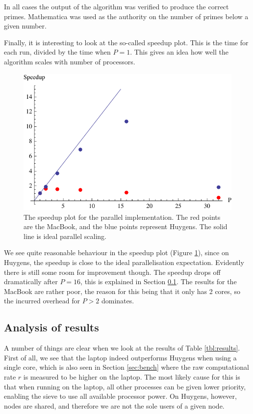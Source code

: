 \documentclass[a4paper]{article}
\begin{document}
In all cases the output of the algorithm was verified to produce the correct
primes. Mathematica was used as the authority on the number of primes below a
given number. 

Finally, it is interesting to look at the so-called speedup plot. This is the time for each run,
divided by the time when $P=1$. This gives an idea how well the algorithm scales with number of 
processors. 

\begin{figure}[h]
    \begin{center}
        \includegraphics{img/speedup}
    \end{center}
    \caption{The speedup plot for the parallel implementation. The red points are the MacBook, and the blue points 
    represent Huygens. The solid line is ideal parallel scaling. }
    \label{fig:speedup}
\end{figure}

We see quite reasonable behaviour in the speedup plot (Figure \ref{fig:speedup}), since on Huygens, the speedup
is close to the ideal parallelisation expectation. Evidently there is still some room for improvement though. The
speedup drops off dramatically after $P=16$, this is explained in Section \ref{sec:analysis}. The results for the 
MacBook are rather poor, the reason for this being that it only has 2 cores, so the incurred overhead for
$P>2$ dominates. 

\subsection{Analysis of results}\label{sec:analysis}

A number of things are clear when we look at the results of Table
\ref{tbl:results}. First of all, we see that the laptop indeed outperforms
Huygens when using a single core, which is also seen in Section \ref{sec:bench}
where the raw computational rate $r$ is measured to be higher on the laptop. The
most likely cause for this is that when running on the laptop, all other
processes can be given lower priority, enabling the sieve to use all available
processor power. On Huygens, however, nodes are shared, and therefore we are not
the sole users of a given node. 
\end{document}
